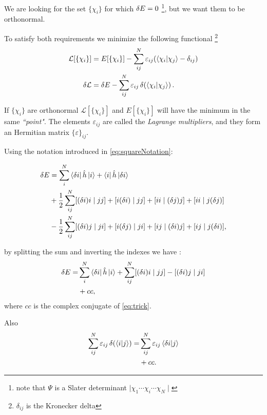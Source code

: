 \documentclass[a4paper,12pt]{article}
\begin{document}
We are looking for the set $\{\chi_i\}$ for which $\var{E} = 0$ \footnote{note that $\Psi$ is a Slater determinant $\mid \chi_1 \cdots \chi_i \cdots \chi_N \mid$}, but we want them to be orthonormal.

To satisfy both requirements we minimize the following functional \footnote{$\delta_{ij}$ is the Kronecker delta} 
\begin{align}
	\mathcal{L}[\{\chi_{i}\}] & = E[\{\chi_i\}] - \sum_{ij}^{N} \varepsilon_{ij} (\bra{\chi_{i}}\ket{\chi_{j}} - \delta_{ij})
\\
	\var{\mathcal{L}} & = \var{E} - \sum_{ij}^{N} \varepsilon_{ij} \var{(\bra{\chi_{i}}\ket{\chi_{j}})}.
\end{align}

If $\{\chi_i\}$ are orthonormal $\mathcal{L}[\{\chi_{i}\}]$ and $E[\{\chi_i\}]$ will have the minimum in the same \textit{``point"}. The elements $\varepsilon_{ij}$ are called the \textit{Lagrange multipliers}, and they form an Hermitian matrix $\{ \varepsilon \}_{ij}$.

Using the notation introduced in \eqref{eq:squareNotation}:

\begin{align}
	\var{E} 	& = \sum_{i}^{N} \bra{\var{i}} \hat{h}  \ket{i} + \bra{i} \hat{h}  \ket{\var{i}} \\
			& + \frac{1}{2} \sum_{ij}^{N} [ (\var{i})i \mid j j ] + [ i(\var{i}) \mid j j ] + [ i i \mid (\var{j}) j ] + [ i i \mid j (\var{j}) ]\\
			& - \frac{1}{2} \sum_{ij}^{N} [ (\var{i})j \mid j i ] + [ i(\var{j}) \mid j i ] + [ i j \mid (\var{i}) j ] + [ i j \mid j (\var{i}) ],
\end{align}

by splitting the sum and inverting the indexes we have \cite[p.117-119]{Attila}:
\begin{align}
	\begin{split}
	\var{E} = &  \sum_{i}^{N} \bra{\var{i}} \hat{h}  \ket{i} + \sum_{ij}^{N}  [ (\var{i})i \mid j j ] - [ (\var{i}) j \mid j i ]  \label{eq:trick} \\
	& +  cc,
	\end{split}
\end{align}
where $cc$ is the complex conjugate of \eqref{eq:trick}.

Also
\begin{align}
\begin{split}
	\sum_{ij}^{N} \varepsilon_{ij} \var{(\bra{i}\ket{j})}  = & \sum_{ij}^{N} \varepsilon_{ij} \bra{\var{i}}\ket{j}  \label{eq:trick2}
	\\ & + cc.
\end{split}
\end{align}
\end{document}
